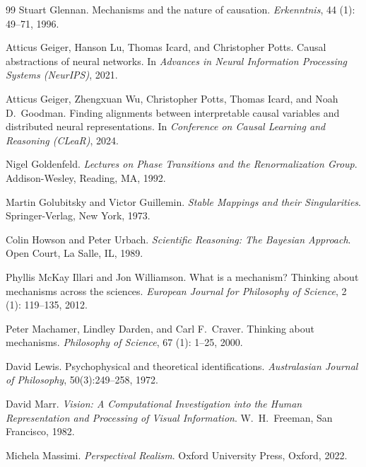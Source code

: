 \documentclass{article}
\begin{document}
\begin{thebibliography}{99}
Stuart Glennan.
\newblock Mechanisms and the nature of causation.
\newblock \emph{Erkenntnis}, 44 (1): 49--71, 1996.

Atticus Geiger, Hanson Lu, Thomas Icard, and Christopher Potts.
\newblock Causal abstractions of neural networks.
\newblock In \emph{Advances in Neural Information Processing Systems
  (NeurIPS)}, 2021.

Atticus Geiger, Zhengxuan Wu, Christopher Potts, Thomas Icard, and Noah D.\
  Goodman.
\newblock Finding alignments between interpretable causal variables and
  distributed neural representations.
\newblock In \emph{Conference on Causal Learning and Reasoning (CLeaR)}, 2024.

Nigel Goldenfeld.
\newblock \emph{Lectures on Phase Transitions and the Renormalization Group}.
\newblock Addison-Wesley, Reading, MA, 1992.

Martin Golubitsky and Victor Guillemin.
\newblock \emph{Stable Mappings and their Singularities}.
\newblock Springer-Verlag, New York, 1973.

Colin Howson and Peter Urbach.
\newblock \emph{Scientific Reasoning: The Bayesian Approach}.
\newblock Open Court, La Salle, IL, 1989.

Phyllis McKay Illari and Jon Williamson.
\newblock What is a mechanism? Thinking about mechanisms across the sciences.
\newblock \emph{European Journal for Philosophy of Science},
  2 (1):\penalty0 119--135, 2012.

Peter Machamer, Lindley Darden, and Carl F.\ Craver.
\newblock Thinking about mechanisms.
\newblock \emph{Philosophy of Science}, 67 (1): 1--25, 2000.

David Lewis.
\newblock Psychophysical and theoretical identifications.
\newblock \emph{Australasian Journal of Philosophy}, 50(3):249--258, 1972.

David Marr.
\newblock \emph{Vision: A Computational Investigation into the Human
  Representation and Processing of Visual Information}.
\newblock W.\ H.\ Freeman, San Francisco, 1982.

Michela Massimi.
\newblock \emph{Perspectival Realism}.
\newblock Oxford University Press, Oxford, 2022.


\end{thebibliography}
\end{document}

